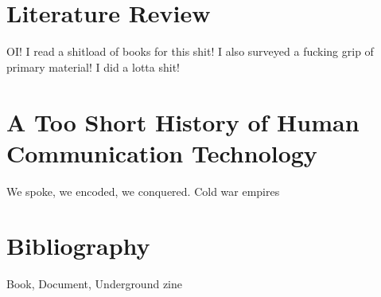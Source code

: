\documentclass{article}
\begin{document}
\section{Literature Review}

OI!  I read a shitload of books for this shit!
I also surveyed a fucking grip of primary material!
I did a lotta shit!

\section{A Too Short History of Human Communication Technology}

We spoke, we encoded, we conquered.
Cold war empires

\section{Bibliography}

Book, 
Document, 
Underground zine
\end{document}
